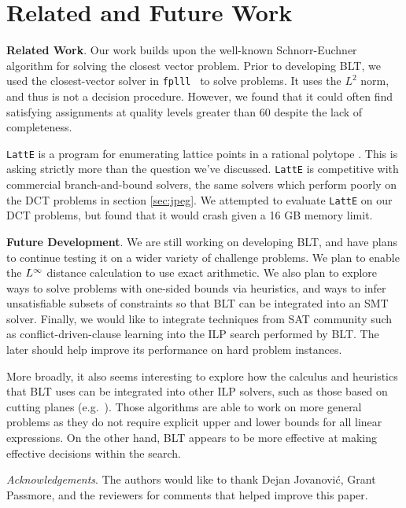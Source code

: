 \section{Related and Future Work}
\label{sec:final}

\textbf{Related Work}.  Our work builds upon the well-known Schnorr-Euchner
algorithm for solving the closest vector problem.  Prior to developing BLT, we
used the closest-vector solver in
\texttt{fplll}~\cite{DBLP:conf/codcry/HanrotPS11} to solve problems.  It uses
the $L^2$ norm, and thus is not a decision procedure.  However, we found that
it could often find satisfying assignments at quality levels greater than $60$
despite the lack of completeness.

\texttt{LattE} is a program for enumerating lattice points in a rational
polytope \cite{DeLoera2004}. This is asking strictly more than the question
we've discussed. \texttt{LattE} is competitive with commercial branch-and-bound
solvers, the same solvers which perform poorly on the DCT problems in section
\ref{sec:jpeg}. We attempted to evaluate \texttt{LattE} on our DCT problems,
but found that it would crash given a 16 GB memory limit.

\textbf{Future Development}.
We are still working on developing BLT, and have plans to continue
testing it on a wider variety of challenge problems.  We plan to
enable the $L^\infty$ distance calculation to use exact arithmetic.  We
also plan to explore ways to solve problems with one-sided bounds via
heuristics, and ways to infer unsatisfiable subsets of constraints so
that BLT can be integrated into an SMT solver.  Finally, we would like
to integrate techniques from SAT community such as
conflict-driven-clause learning into the ILP search performed by BLT.
The later should help improve its performance on hard problem instances.

More broadly, it also seems interesting to explore how the calculus and
heuristics that BLT uses can be integrated into other ILP solvers, such as those
based on cutting planes (e.g.~\cite{DBLP:journals/jar/JovanovicM13}).  Those algorithms
are able to work on more general problems as they do not require explicit upper
and lower bounds for all linear expressions.  On the other hand, BLT appears
to be more effective at making effective decisions within the search.

\textit{Acknowledgements}. The authors would like to thank Dejan Jovanovi\'{c},
Grant Passmore, and the reviewers for comments that helped improve this paper.
